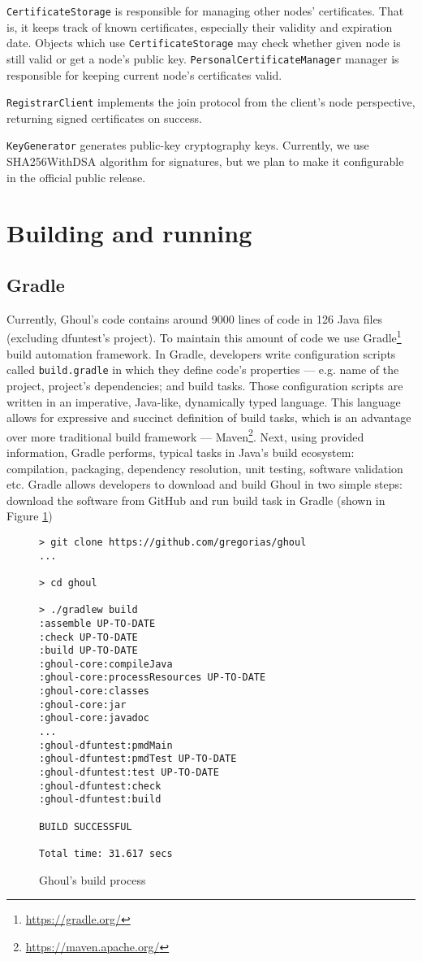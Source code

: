\texttt{CertificateStorage} is responsible for managing other nodes'
certificates.
That is, it keeps track of known certificates, especially their validity and
expiration date.
Objects which use \texttt{CertificateStorage} may check whether given node
is still valid or get a node's public key.
\texttt{PersonalCertificateManager} manager is responsible for keeping current
node's certificates valid.

\texttt{RegistrarClient} implements the join protocol from the client's node
perspective, returning signed certificates on success.

\texttt{KeyGenerator} generates public-key cryptography keys.
Currently, we use SHA256WithDSA algorithm for signatures,
but we plan to make it configurable in the official public release.

\section{Building and running}
\label{sec:build}

\subsection{Gradle}
Currently, Ghoul's code contains around 9000 lines of code in 126 Java files
(excluding dfuntest's project).
To maintain this amount of code we use
Gradle\footnote{\url{https://gradle.org/}} build automation framework.
In Gradle, developers write configuration scripts called \texttt{build.gradle}
in which they define code's properties --- e.g. name of the project, project's
dependencies; and build tasks.
Those configuration scripts are written in an imperative, Java-like, dynamically
typed language.
This language allows for expressive and succinct definition of build tasks,
which is an advantage over more traditional build framework ---
Maven\footnote{\url{https://maven.apache.org/}}.
Next, using provided information, Gradle performs, typical tasks in Java's build
ecosystem: compilation, packaging, dependency resolution, unit testing, software
validation etc.
Gradle allows developers to download and build Ghoul in two simple steps:
download the software from GitHub and run build task in Gradle (shown in Figure
\ref{fig:ghoul_build_process})

\begin{figure}[tb]
\begin{verbatim}
> git clone https://github.com/gregorias/ghoul
...

> cd ghoul

> ./gradlew build
:assemble UP-TO-DATE
:check UP-TO-DATE
:build UP-TO-DATE
:ghoul-core:compileJava
:ghoul-core:processResources UP-TO-DATE
:ghoul-core:classes
:ghoul-core:jar
:ghoul-core:javadoc
...
:ghoul-dfuntest:pmdMain
:ghoul-dfuntest:pmdTest UP-TO-DATE
:ghoul-dfuntest:test UP-TO-DATE
:ghoul-dfuntest:check
:ghoul-dfuntest:build

BUILD SUCCESSFUL

Total time: 31.617 secs
\end{verbatim}
\caption{Ghoul's build process}
\label{fig:ghoul_build_process}
\end{figure}

